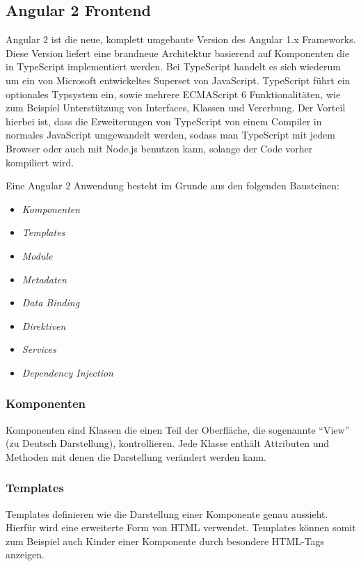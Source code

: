 \subsection{Angular 2 Frontend}

Angular 2 ist die neue, komplett umgebaute Version des Angular 1.x Frameworks. Diese Version liefert eine brandneue Architektur basierend auf Komponenten die in TypeScript implementiert werden. Bei TypeScript handelt es sich wiederum um ein von Microsoft entwickeltes Superset von JavaScript. TypeScript führt ein optionales Typsystem ein, sowie mehrere ECMAScript 6 Funktionalitäten, wie zum Beispiel Unterstützung von Interfaces, Klassen und Vererbung. Der Vorteil hierbei ist, dass die Erweiterungen von TypeScript von einem Compiler in normales JavaScript umgewandelt werden, sodass man TypeScript mit jedem Browser oder auch mit Node.js benutzen kann, solange der Code vorher kompiliert wird\cite{Deeleman2016}. 


Eine Angular 2 Anwendung besteht im Grunde aus den folgenden Bausteinen\cite{Angular.io2017}:
\begin{itemize}
	\item \textit{Komponenten}
	\item \textit{Templates} 
	\item \textit{Module}
	\item \textit{Metadaten}
	\item \textit{Data Binding} 
	\item \textit{Direktiven}
	\item \textit{Services}
	\item \textit{Dependency Injection}
\end{itemize}

\subsubsection{Komponenten}
Komponenten sind Klassen die einen Teil der Oberfläche, die sogenannte \enquote{View} (zu Deutsch Darstellung), kontrollieren. Jede Klasse enthält Attributen und Methoden mit denen die Darstellung verändert werden kann.

\subsubsection{Templates}
Templates definieren wie die Darstellung einer Komponente genau aussieht. Hierfür wird eine erweiterte Form von \acs{HTML} verwendet. Templates können somit zum Beispiel auch Kinder einer Komponente durch besondere HTML-Tags anzeigen. 

